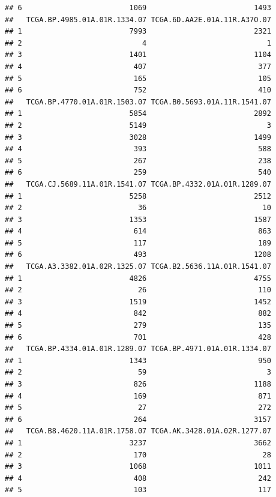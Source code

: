 \documentclass[
]{article}
\begin{document}
\begin{verbatim}
## 6                         1069                         1493
##   TCGA.BP.4985.01A.01R.1334.07 TCGA.6D.AA2E.01A.11R.A37O.07
## 1                         7993                         2321
## 2                            4                            1
## 3                         1401                         1104
## 4                          407                          377
## 5                          165                          105
## 6                          752                          410
##   TCGA.BP.4770.01A.01R.1503.07 TCGA.B0.5693.01A.11R.1541.07
## 1                         5854                         2892
## 2                         5149                            3
## 3                         3028                         1499
## 4                          393                          588
## 5                          267                          238
## 6                          259                          540
##   TCGA.CJ.5689.11A.01R.1541.07 TCGA.BP.4332.01A.01R.1289.07
## 1                         5258                         2512
## 2                           36                           10
## 3                         1353                         1587
## 4                          614                          863
## 5                          117                          189
## 6                          493                         1208
##   TCGA.A3.3382.01A.02R.1325.07 TCGA.B2.5636.11A.01R.1541.07
## 1                         4826                         4755
## 2                           26                          110
## 3                         1519                         1452
## 4                          842                          882
## 5                          279                          135
## 6                          701                          428
##   TCGA.BP.4334.01A.01R.1289.07 TCGA.BP.4971.01A.01R.1334.07
## 1                         1343                          950
## 2                           59                            3
## 3                          826                         1188
## 4                          169                          871
## 5                           27                          272
## 6                          264                         3157
##   TCGA.B8.4620.11A.01R.1758.07 TCGA.AK.3428.01A.02R.1277.07
## 1                         3237                         3662
## 2                          170                           28
## 3                         1068                         1011
## 4                          408                          242
## 5                          103                          117

\end{verbatim}
\end{document}

